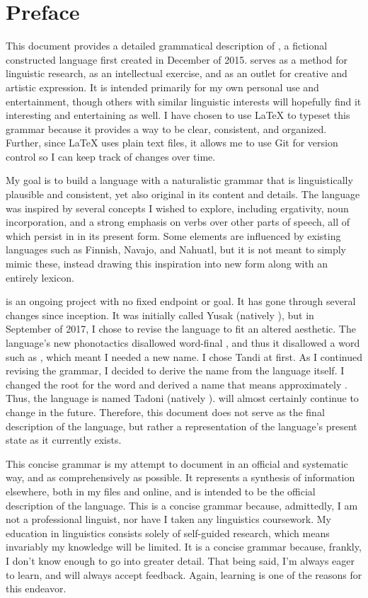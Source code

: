 \chapter{Preface}
\label{cha:preface}

This document provides a detailed grammatical description of \lang{}, a fictional constructed language first created in December of 2015. \lang{} serves as a method for linguistic research, as an intellectual exercise, and as an outlet for creative and artistic expression. It is intended primarily for my own personal use and entertainment, though others with similar linguistic interests will hopefully find it interesting and entertaining as well. I have chosen to use \LaTeX{} to typeset this grammar because it provides a way to be clear, consistent, and organized. Further, since \LaTeX{} uses plain text files, it allows me to use Git for version control so I can keep track of changes over time.

My goal is to build a language with a naturalistic grammar that is linguistically plausible and consistent, yet also original in its content and details. The language was inspired by several concepts I wished to explore, including ergativity, noun incorporation, and a strong emphasis on verbs over other parts of speech, all of which persist in \lang{} in its present form. Some elements are influenced by existing languages such as Finnish, Navajo, and Nahuatl, but it is not meant to simply mimic these, instead drawing this inspiration into new form along with an entirely  lexicon.

\lang{} is an ongoing project with no fixed endpoint or goal. It has gone through several changes since inception. It was initially called Yusak (natively ), but in September of 2017, I chose to revise the language to fit an altered aesthetic. The language's new phonotactics disallowed word-final , and thus it disallowed a word such as , which meant I needed a new name. I chose Tandi at first. As I continued revising the grammar, I decided to derive the name from the language itself. I changed the root for the word  and derived a name that means approximately . Thus, the language is named Tadoni (natively \fw{\nlang{}}). \lang{} will almost certainly continue to change in the future. Therefore, this document does not serve as the final description of the language, but rather a representation of the language's present state as it currently exists.

This concise grammar is my attempt to document \lang{} in an official and systematic way, and as comprehensively as possible. It represents a synthesis of information elsewhere, both in my files and online, and is intended to be the official description of the language. This is a concise grammar because, admittedly, I am not a professional linguist, nor have I taken any linguistics coursework. My education in linguistics consists solely of self-guided research, which means invariably my knowledge will be limited. It is a concise grammar because, frankly, I don't know enough to go into greater detail. That being said, I'm always eager to learn, and will always accept feedback. Again, learning is one of the reasons for this endeavor.

